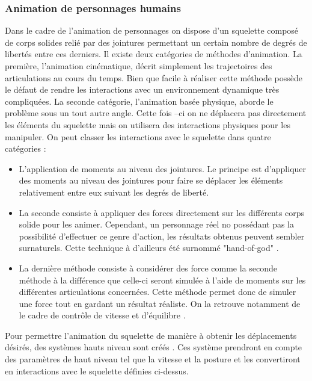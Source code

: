\documentclass{llncs}
\begin{document}
\subsubsection{Animation de personnages humains} 
	Dans le cadre de l'animation de personnages on dispose d'un squelette composé de corps solides relié par des jointures permettant un certain nombre de degrés de libertés entre ces derniers. Il existe deux catégories de méthodes d'animation. La première, l'animation cinématique, décrit simplement les trajectoires des articulations au cours du temps. Bien que facile à réaliser cette méthode possède le défaut de rendre les interactions avec un environnement dynamique très compliquées. La seconde catégorie, l'animation basée physique, aborde le problème sous un tout autre angle. Cette fois –ci on ne déplacera pas directement les éléments du squelette mais on utilisera des interactions physiques pour les manipuler. On peut classer les interactions avec le squelette dans quatre catégories \cite{geijtenbeek2012interactive}: \newline
\begin{itemize}
	\item{L'application de moments au niveau des jointures. Le principe est d'appliquer des moments au niveau des jointures pour faire se déplacer les éléments relativement entre eux suivant les degrés de liberté.}
	\item{La seconde consiste à appliquer des forces directement sur les différents corps solide pour les animer. Cependant, un personnage réel no possédant pas la possibilité d'effectuer ce genre d'action, les résultats obtenus peuvent sembler  surnaturels. Cette technique à d'ailleurs été surnommé "hand-of-god" \cite{van1995guided}. }
	\item{La dernière méthode consiste à considérer des force comme la seconde méthode à la différence que celle-ci seront simulée à l'aide de moments sur les différentes articulations concernées. Cette méthode permet donc de simuler une force tout en gardant un résultat réaliste. On la retrouve notamment de le cadre de contrôle de vitesse et d'équilibre \cite{coros2010generalized}.}
\end{itemize}

	Pour permettre l'animation du squelette de manière à obtenir les déplacements désirés, des systèmes hauts niveau sont créés \cite{geijtenbeek2012interactive}. Ces système prendront en compte des paramètres de haut niveau tel que la vitesse et la posture et les convertiront en interactions avec le squelette définies ci-dessus. 
\end{document}
